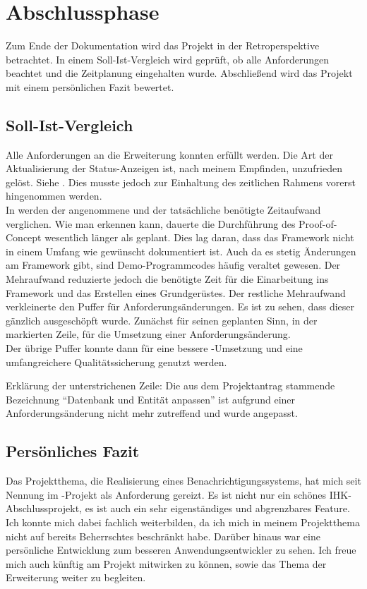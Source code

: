 \section{Abschlussphase} 
\label{sec:Abschlussphase}
Zum Ende der Dokumentation wird das Projekt in der Retroperspektive betrachtet. In einem Soll-Ist-Vergleich wird geprüft, ob alle
Anforderungen beachtet und die Zeitplanung eingehalten wurde. Abschließend wird das Projekt mit einem
persönlichen Fazit bewertet.


\subsection{Soll-Ist-Vergleich}
\label{sub:Soll-Ist-Vergleich}
Alle Anforderungen an die Erweiterung konnten erfüllt werden. Die Art der Aktualisierung der Status-Anzeigen ist, nach meinem
Empfinden, unzufrieden gelöst. Siehe . Dies musste jedoch zur Einhaltung des zeitlichen Rahmens
vorerst hingenommen werden.\\
\endgroup
In  werden der angenommene und der tatsächliche benötigte Zeitaufwand verglichen. Wie man erkennen
kann, dauerte die Durchführung des Proof-of-Concept wesentlich länger als geplant. Dies lag daran, dass das Framework
 nicht in einem Umfang wie gewünscht dokumentiert ist. Auch da es stetig Änderungen am Framework gibt,
sind Demo-Programmcodes häufig veraltet gewesen. Der Mehraufwand reduzierte jedoch die benötigte Zeit für die Einarbeitung ins
Framework und das Erstellen eines Grundgerüstes. Der restliche Mehraufwand verkleinerte den Puffer für Anforderungsänderungen. Es
ist zu sehen, dass dieser gänzlich ausgeschöpft wurde. Zunächst für seinen geplanten Sinn, in der markierten Zeile, für die
Umsetzung einer Anforderungsänderung. \\
Der übrige Puffer konnte dann für eine bessere -Umsetzung und eine umfangreichere Qualitätssicherung genutzt
werden.

Erklärung der unterstrichenen Zeile: Die aus dem Projektantrag stammende Bezeichnung "`Datenbank und Entität anpassen"' ist
aufgrund einer Anforderungsänderung nicht mehr zutreffend und wurde angepasst.

\subsection{Persönliches Fazit}
\label{sub:Fazit}
Das Projektthema, die Realisierung eines Benachrichtigungssystems, hat mich seit Nennung im -Projekt als
Anforderung gereizt. Es ist nicht nur ein schönes IHK-Abschlussprojekt, es ist auch ein sehr eigenständiges und abgrenzbares
Feature. Ich konnte mich dabei fachlich weiterbilden, da ich mich in meinem Projektthema nicht auf bereits Beherrschtes beschränkt
habe. Darüber hinaus war eine persönliche Entwicklung zum besseren Anwendungsentwickler zu sehen. Ich freue mich auch künftig am
Projekt  mitwirken zu können, sowie das Thema der Erweiterung weiter zu begleiten.
